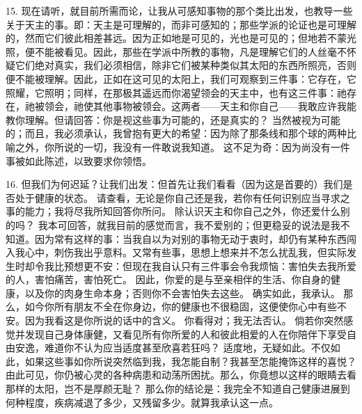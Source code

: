 15. 现在请听，就目前所需而论，让我从可感知事物的那个类比出发，也教导一些关于天主的事。即：天主是可理解的，而非可感知的；那些学派的论证也是可理解的，然而它们彼此相差甚远。因为正如地是可见的，光也是可见的；但地若不蒙光照，便不能被看见。因此，那些在学派中所教的事物，凡是理解它们的人丝毫不怀疑它们绝对真实，我们必须相信，除非它们被某种类似其太阳的东西所照亮，否则便不能被理解。因此，正如在这可见的太阳上，我们可观察到三件事：它存在，它照耀，它照明；同样，在那极其遥远而你渴望领会的天主中，也有这三件事：祂存在，祂被领会，祂使其他事物被领会。这两者——天主和你自己——我敢应许我能教你理解。但请回答：你是视这些事为可能的，还是真实的？ 当然被视为可能的；而且，我必须承认，我曾抱有更大的希望：因为除了那条线和那个球的两种比喻之外，你所说的一切，我没有一件敢说我知道。 这不足为奇：因为尚没有一件事被如此陈述，以致要求你领悟。\par

16. 但我们为何迟延？让我们出发：但首先让我们看看（因为这是首要的）我们是否处于健康的状态。 请查看，无论是你自己还是我，若你有任何识别应当寻求之事的能力；我将尽我所知回答你所问。 除认识天主和你自己之外，你还爱什么别的吗？ 我本可回答，就我目前的感觉而言，我不爱别的；但更稳妥的说法是我不知道。因为常有这样的事：当我自以为对别的事物无动于衷时，却仍有某种东西闯入我心中，刺伤我出乎意料。又常有些事，思想上想来并不怎么扰乱我，但实际发生时却令我比预想更不安：但现在我自认只有三件事会令我烦恼：害怕失去我所爱的人，害怕痛苦，害怕死亡。 因此，你爱的是与至亲相伴的生活、你自身的健康，以及你的肉身生命本身；否则你不会害怕失去这些。 确实如此，我承认。 那么，如今你所有朋友不全在你身边，你的健康也不很稳固，这便使你心中有些不安。因为我看这是你所说的话中的含义。 你看得对；我无法否认。 倘若你突然感觉并发现自己身体康健，又看见所有你所爱的人和彼此相爱的人在你陪伴下享受自由安逸，难道你不认为应当适度甚至欣喜若狂吗？ 适度地，无疑如此。不仅如此，如果这些事如你所说突然临到我，我怎能自制？我甚至怎能掩饰这样的喜悦？ 由此可见，你仍被心灵的各种病患和动荡所困扰。那么，你竟想以这样的眼睛去看那样的太阳，岂不是厚颜无耻？ 那么你的结论是：我完全不知道自己健康进展到何种程度，疾病减退了多少，又残留多少。就算我承认这一点。\par

